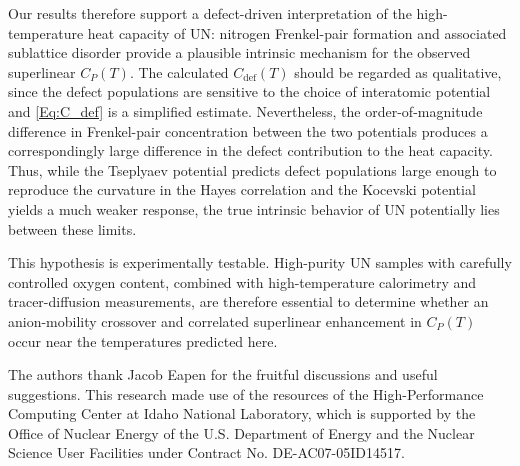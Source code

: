 \documentclass[
preprint, linenumbers,
amsmath, amssymb, aps, physrev,
]{revtex4-2}
\newcommand{\?}{\stackrel{?}{=}}
\begin{document}

Our results therefore support a defect-driven interpretation of the high-temperature heat capacity of UN: nitrogen Frenkel-pair formation and associated sublattice disorder provide a plausible intrinsic mechanism for the observed superlinear $C_P(T)$. The calculated $C_{\mathrm{def}}(T)$ should be regarded as qualitative, since the defect populations are sensitive to the choice of interatomic potential and \cref{Eq:C_def} is a simplified estimate. Nevertheless, the order-of-magnitude difference in Frenkel-pair concentration between the two potentials produces a correspondingly large difference in the defect contribution to the heat capacity. Thus, while the Tseplyaev potential predicts defect populations large enough to reproduce the curvature in the Hayes correlation and the Kocevski potential yields a much weaker response, the true intrinsic behavior of UN potentially lies between these limits.

This hypothesis is experimentally testable. High-purity UN samples with carefully controlled oxygen content, combined with high-temperature calorimetry and tracer-diffusion measurements, are therefore essential to determine whether an anion-mobility crossover and correlated superlinear enhancement in $C_P(T)$ occur near the temperatures predicted here.

\begin{acknowledgments}

The authors thank Jacob Eapen for the fruitful discussions and useful suggestions. This research made use of the resources of the High-Performance Computing Center at Idaho National Laboratory, which is supported by the Office of Nuclear Energy of the U.S. Department of Energy and the Nuclear Science User Facilities under Contract No. DE-AC07-05ID14517.

\end{acknowledgments}

\end{document}
